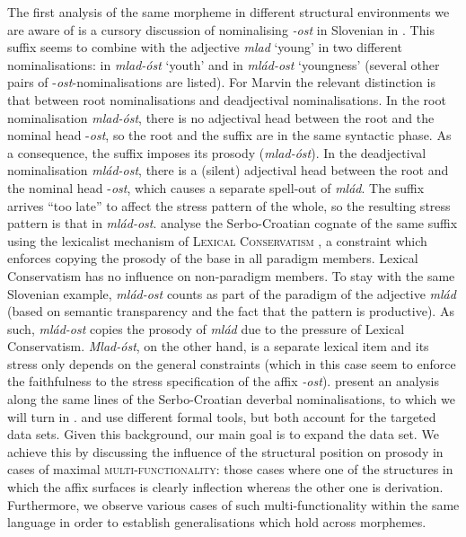 \documentclass[output=paper]{langsci/langscibook}
\begin{document}
The first analysis of the same morpheme in different structural environments we are aware of is a cursory discussion of nominalising \textit{-ost} in Slovenian in \citet{Mar2002}. This suffix seems to combine with the adjective \textit{mlad} `young' in two different nominalisations: in \textit{mlad-óst} `youth' and in \textit{mlád-ost} `youngness' (several other pairs of -\textit{ost}-nominalisations are listed). For Marvin the relevant distinction is that between root nominalisations and deadjectival nominalisations. In the root nominalisation \textit{mlad-}\textit{óst}, there is no adjectival head between the root and the nominal head -\textit{ost}, so the root and the suffix are in the same syntactic phase. As a consequence, the suffix imposes its prosody (\textit{mlad-óst}). In the deadjectival nominalisation \textit{mlád-ost}, there is a (silent) adjectival head between the root and the nominal head -\textit{ost}, which causes a separate spell-out of \textit{mlád}. The suffix arrives “too late” to affect the stress pattern of the whole, so the resulting stress pattern is that in \textit{mlád-}\textit{ost}. \citet{Arsim2013} analyse the Serbo-Croatian cognate of the same suffix using the lexicalist mechanism of \textsc{Lexical Conservatism} \citep[first proposed in][]{Ste1997}, a constraint which enforces copying the prosody of the base in all paradigm members. Lexical Conservatism has no influence on non-paradigm members. To stay with the same Slovenian example, \textit{mlád-}\textit{ost} counts as part of the paradigm of  the adjective \textit{mlád} (based on semantic transparency and the fact that the pattern is productive). As such, \textit{mlád-}\textit{ost} copies the prosody of \textit{mlád} due to the pressure of Lexical Conservatism. \textit{Mlad-}\textit{óst}, on the other hand, is a separate lexical item and its stress only depends on the general constraints (which in this case seem to enforce the faithfulness to the stress specification of the affix \textit{-ost}). \citet{Sim2014} present an analysis along the same lines of the Serbo-Croatian deverbal nominalisations, to which we will turn in . 
\citet{Mar2002} and \citet{Arsim2013} use different formal tools, but both account for the targeted data sets. Given this background, our main goal is to expand the data set. We achieve this by discussing the influence of the structural position on prosody in cases of maximal \textsc{multi-functionality}: those cases where one of the structures in which the affix surfaces is clearly inflection whereas the other one is derivation. Furthermore, we observe various cases of such multi-functionality within the same language in order to establish generalisations which hold across morphemes. 
\end{document}
